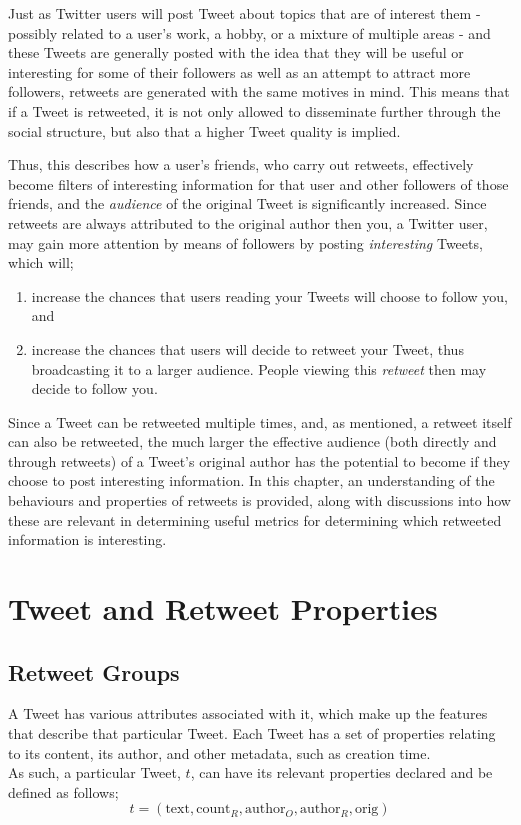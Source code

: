 Just as Twitter users will post Tweet about topics that are of interest them - possibly related to a user's work, a hobby, or a mixture of multiple areas - and these Tweets are generally posted with the idea that they will be useful or interesting for some of their followers as well as an attempt to attract more followers, retweets are generated with the same motives in mind. This means that if a Tweet is retweeted, it is not only allowed to disseminate further through the social structure, but also that a higher Tweet quality is implied.

Thus, this describes how a user's friends, who carry out retweets, effectively become filters of interesting information for that user and other followers of those friends, and the \textit{audience} of the original Tweet is significantly increased. Since retweets are always attributed to the original author then you, a Twitter user, may gain more attention by means of followers by posting \textit{interesting} Tweets, which will; 
\begin{enumerate}
\item increase the chances that users reading your Tweets will choose to follow you, and
\item increase the chances that users will decide to retweet your Tweet, thus broadcasting it to a larger audience. People viewing this \textit{retweet} then may decide to follow you. 
\end{enumerate}

Since a Tweet can be retweeted multiple times, and, as mentioned, a retweet itself can also be retweeted, the much larger the effective audience (both directly and through retweets) of a Tweet's original author has the potential to become if they choose to post interesting information. In this chapter, an understanding of the behaviours and properties of retweets is provided, along with discussions into how these are relevant in determining useful metrics for determining which retweeted information is interesting.


\section{Tweet and Retweet Properties}

\subsection{Retweet Groups}
A Tweet has various attributes associated with it, which make up the features that describe that particular Tweet. Each Tweet has a set of properties relating to its content, its author, and other metadata, such as creation time.\\
As such, a particular Tweet, $t$, can have its relevant properties declared and be defined as follows;
\[
	t = (\mathrm{text}, \mathrm{count}_R, \mathrm{author}_O, \mathrm{author}_R, \mathrm{orig})
\]

